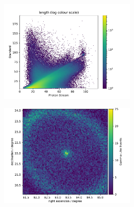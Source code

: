 \begin{frame}[t]
    \begin{figure}
        \centering
        \includegraphics[width=0.6\textwidth]{fig/length_compare.pdf}
    \end{figure}
\end{frame}

\begin{frame}[t]
    \begin{figure}
        \centering
        \includegraphics[width=0.6\textwidth]{fig/skymap_data.pdf}
    \end{figure}
\end{frame}



